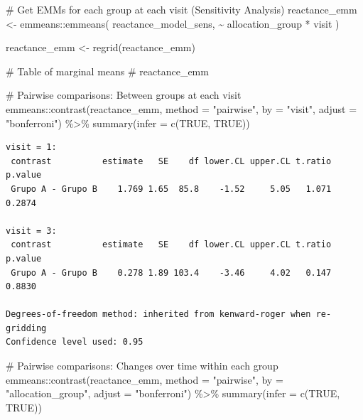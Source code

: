 \documentclass[
  12pt,
]{article}
\newenvironment{Shaded}{\begin{snugshade}}{\end{snugshade}}
\newcommand{\AttributeTok}[1]{\textcolor[rgb]{0.40,0.45,0.13}{#1}}
\newcommand{\CommentTok}[1]{\textcolor[rgb]{0.37,0.37,0.37}{#1}}
\newcommand{\ConstantTok}[1]{\textcolor[rgb]{0.56,0.35,0.01}{#1}}
\newcommand{\FunctionTok}[1]{\textcolor[rgb]{0.28,0.35,0.67}{#1}}
\newcommand{\NormalTok}[1]{\textcolor[rgb]{0.00,0.23,0.31}{#1}}
\newcommand{\OtherTok}[1]{\textcolor[rgb]{0.00,0.23,0.31}{#1}}
\newcommand{\SpecialCharTok}[1]{\textcolor[rgb]{0.37,0.37,0.37}{#1}}
\newcommand{\StringTok}[1]{\textcolor[rgb]{0.13,0.47,0.30}{#1}}
\begin{document}
\begin{Shaded}
\begin{Highlighting}[]
\CommentTok{\# Get EMMs for each group at each visit (Sensitivity Analysis)}
\NormalTok{reactance\_emm }\OtherTok{\textless{}{-}}\NormalTok{ emmeans}\SpecialCharTok{::}\FunctionTok{emmeans}\NormalTok{(}
\NormalTok{    reactance\_model\_sens, }
    \SpecialCharTok{\textasciitilde{}}\NormalTok{ allocation\_group }\SpecialCharTok{*}\NormalTok{ visit}
\NormalTok{)}

\NormalTok{reactance\_emm }\OtherTok{\textless{}{-}} \FunctionTok{regrid}\NormalTok{(reactance\_emm)}

\CommentTok{\# Table of marginal means}
\CommentTok{\# reactance\_emm}

\CommentTok{\# Pairwise comparisons: Between groups at each visit}
\NormalTok{emmeans}\SpecialCharTok{::}\FunctionTok{contrast}\NormalTok{(reactance\_emm,}
\AttributeTok{method =} \StringTok{"pairwise"}\NormalTok{, }\AttributeTok{by =} \StringTok{"visit"}\NormalTok{,}
\AttributeTok{adjust =} \StringTok{"bonferroni"}\NormalTok{) }\SpecialCharTok{\%\textgreater{}\%} \FunctionTok{summary}\NormalTok{(}\AttributeTok{infer =} \FunctionTok{c}\NormalTok{(}\ConstantTok{TRUE}\NormalTok{, }\ConstantTok{TRUE}\NormalTok{))}
\end{Highlighting}
\end{Shaded}

\begin{verbatim}
visit = 1:
 contrast          estimate   SE    df lower.CL upper.CL t.ratio p.value
 Grupo A - Grupo B    1.769 1.65  85.8    -1.52     5.05   1.071  0.2874

visit = 3:
 contrast          estimate   SE    df lower.CL upper.CL t.ratio p.value
 Grupo A - Grupo B    0.278 1.89 103.4    -3.46     4.02   0.147  0.8830

Degrees-of-freedom method: inherited from kenward-roger when re-gridding 
Confidence level used: 0.95 
\end{verbatim}

\begin{Shaded}
\begin{Highlighting}[]
\CommentTok{\# Pairwise comparisons: Changes over time within each group}
\NormalTok{emmeans}\SpecialCharTok{::}\FunctionTok{contrast}\NormalTok{(reactance\_emm,}
\AttributeTok{method =} \StringTok{"pairwise"}\NormalTok{, }\AttributeTok{by =} \StringTok{"allocation\_group"}\NormalTok{,}
\AttributeTok{adjust =} \StringTok{"bonferroni"}\NormalTok{) }\SpecialCharTok{\%\textgreater{}\%} \FunctionTok{summary}\NormalTok{(}\AttributeTok{infer =} \FunctionTok{c}\NormalTok{(}\ConstantTok{TRUE}\NormalTok{, }\ConstantTok{TRUE}\NormalTok{))}
\end{Highlighting}
\end{Shaded}
\end{document}
